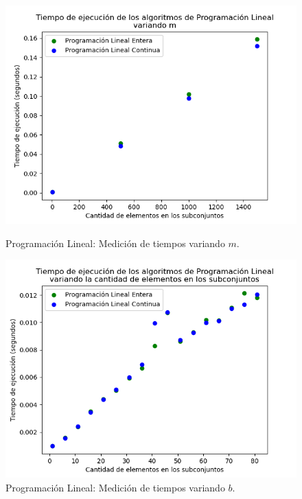 \begin{figure}[h]
    \centering
    \begin{minipage}{0.45\textwidth}
        \centering
        \includegraphics[width=\textwidth]{img/medicion_t_pl_var_m.png}
        \caption{Programación Lineal: Medición de tiempos variando $m$.}
        \label{fig:medicion_t_pl_var_m}
    \end{minipage}\hfill
    \begin{minipage}{0.45\textwidth}
        \centering
        \includegraphics[width=\textwidth]{img/medicion_t_pl_var_b.png}
        \caption{Programación Lineal: Medición de tiempos variando $b$.}
        \label{fig:medicion_t_pl_var_b}
    \end{minipage}
\end{figure}

